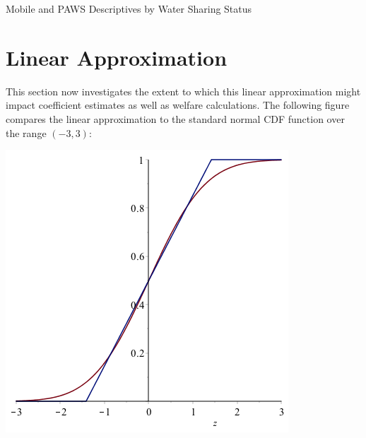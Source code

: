 \documentclass[12pt]{article}
\begin{document}
\begin{appendices}


\begin{table}
\centering
\caption{Mobile and PAWS Descriptives by Water Sharing Status}\label{table:pollfishpawssharing}

\end{table}


\section{Linear Approximation}\label{appendix:linearapprox}

This section now investigates the extent to which this linear approximation might impact coefficient estimates as well as welfare calculations.  The following figure compares the linear approximation to the standard normal CDF function over the range $(-3,3)$:
\begin{center}
\includegraphics[scale=.5]{tables/cdf_approx.png}
\end{center}

\end{appendices}
\end{document}
